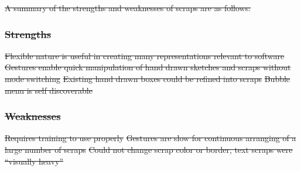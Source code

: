 \documentclass[12pt,fleqn]{ucithesis}
\providecommand{\DIFdeltex}[1]{{\protect\color{red}\sout{#1}}}                      %
\providecommand{\DIFdelbegin}{} %
\providecommand{\DIFdel}[1]{\texorpdfstring{\DIFdeltex{#1}}{}} %
\begin{document}
\DIFdelbegin \DIFdel{A summary of the strengths and weaknesses of scraps are as follows:
}%

\subsubsection{\DIFdel{Strengths}}
\addtocounter{subsubsection}{-1}%

\DIFdel{Flexible nature is useful in creating many representations relevant to software
	}%
\DIFdel{Gestures enable quick manipulation of hand drawn sketches and scraps without mode switching
	}%
\DIFdel{Existing hand drawn boxes could be refined into scraps
	}%
\DIFdel{Bubble menu is self discoverable
}%

\subsubsection{\DIFdel{Weaknesses}}
\addtocounter{subsubsection}{-1}%
\DIFdel{Requires training to use properly
	}%
\DIFdel{Gestures are slow for continuous arranging of a large number of scraps
	}%
\DIFdel{Could not change scrap color or border, text scraps were ``visually heavy''
}%
\end{document}
